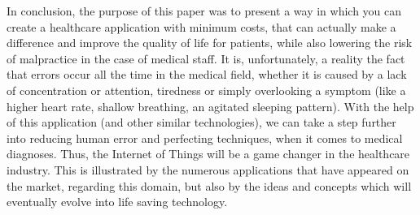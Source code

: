 In conclusion, the purpose of this paper was to present a way in which you can create a healthcare application with minimum costs, that can actually make a difference and improve the quality of life for patients, while also lowering the risk of malpractice in the case of medical staff. It is, unfortunately, a reality the fact that errors occur all the time in the medical field, whether it is caused by a lack of concentration or attention, tiredness or simply overlooking a symptom (like a higher heart rate, shallow breathing, an agitated sleeping pattern). With the help of this application (and other similar technologies), we can take a step further into reducing human error and perfecting techniques, when it comes to medical diagnoses. Thus, the Internet of Things will be a game changer in the healthcare industry. This is illustrated by the numerous applications that have appeared on the market, regarding this domain, but also by the ideas and concepts which will eventually evolve into life saving technology.  